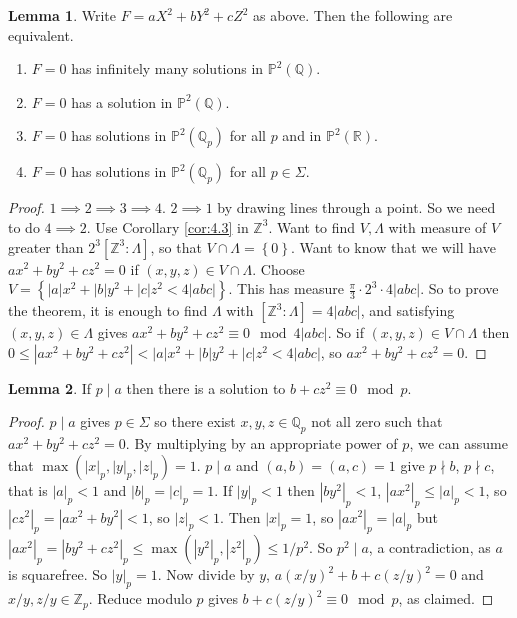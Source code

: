 \documentclass{article}
\newcommand{\Z}{\mathbb{Z}}
\newcommand{\Q}{\mathbb{Q}}
\newcommand{\R}{\mathbb{R}}
\renewcommand{\P}{\mathbb{P}}
\newcommand{\rb}[1]{\left( #1 \right)}
\renewcommand{\sb}[1]{\left[ #1 \right]}
\newcommand{\cb}[1]{\left\{ #1 \right\}}
\newcommand{\abs}[1]{\left\lvert #1 \right\rvert}
\theoremstyle{definition}\newtheorem{definition}{Definition}[section]
\theoremstyle{definition}\newtheorem{remark}[definition]{Remark}
\theoremstyle{definition}\newtheorem*{example}{Example}
\theoremstyle{definition}\newtheorem*{note}{Note}
\newtheorem{lemma}[definition]{Lemma}
\begin{document}
\begin{lemma}
Write $ F = aX^2 + bY^2 + cZ^2 $ as above. Then the following are equivalent.
\begin{enumerate}
\item $ F = 0 $ has infinitely many solutions in $ \P^2\rb{\Q} $.
\item $ F = 0 $ has a solution in $ \P^2\rb{\Q} $.
\item $ F = 0 $ has solutions in $ \P^2\rb{\Q_p} $ for all $ p $ and in $ \P^2\rb{\R} $.
\item $ F = 0 $ has solutions in $ \P^2\rb{\Q_p} $ for all $ p \in \Sigma $.
\end{enumerate}
\end{lemma}

\begin{proof}
$ 1 \implies 2 \implies 3 \implies 4 $. $ 2 \implies 1 $ by drawing lines through a point. So we need to do $ 4 \implies 2 $. Use Corollary \ref{cor:4.3} in $ \Z^3 $. Want to find $ V, \Lambda $ with measure of $ V $ greater than $ 2^3\sb{\Z^3 : \Lambda} $, so that $ V \cap \Lambda = \cb{0} $. Want to know that we will have $ ax^2 + by^2 + cz^2 = 0 $ if $ \rb{x, y, z} \in V \cap \Lambda $. Choose $ V = \cb{\abs{a}x^2 + \abs{b}y^2 + \abs{c}z^2 < 4\abs{abc}} $. This has measure $ \tfrac{\pi}{3} \cdot 2^3 \cdot 4\abs{abc} $. So to prove the theorem, it is enough to find $ \Lambda $ with $ \sb{\Z^3 : \Lambda} = 4\abs{abc} $, and satisfying $ \rb{x, y, z} \in \Lambda $ gives $ ax^2 + by^2 + cz^2 \equiv 0 \mod 4\abs{abc} $. So if $ \rb{x, y, z} \in V \cap \Lambda $ then $ 0 \le \abs{ax^2 + by^2 + cz^2} < \abs{a}x^2 + \abs{b}y^2 + \abs{c}z^2 < 4\abs{abc} $, so $ ax^2 + by^2 + cz^2 = 0 $.
\end{proof}


\begin{lemma}
If $ p \mid a $ then there is a solution to $ b + cz^2 \equiv 0 \mod p $.
\end{lemma}

\begin{proof}
$ p \mid a $ gives $ p \in \Sigma $ so there exist $ x, y, z \in \Q_p $ not all zero such that $ ax^2 + by^2 + cz^2 = 0 $. By multiplying by an appropriate power of $ p $, we can assume that $ \max\rb{\abs{x}_p, \abs{y}_p, \abs{z}_p} = 1 $. $ p \mid a $ and $ \rb{a, b} = \rb{a, c} = 1 $ give $ p \nmid b $, $ p \nmid c $, that is $ \abs{a}_p < 1 $ and $ \abs{b}_p = \abs{c}_p = 1 $. If $ \abs{y}_p < 1 $ then $ \abs{by^2}_p < 1 $, $ \abs{ax^2}_p \le \abs{a}_p < 1 $, so $ \abs{cz^2}_p = \abs{ax^2 + by^2} < 1 $, so $ \abs{z}_p < 1 $. Then $ \abs{x}_p = 1 $, so $ \abs{ax^2}_p = \abs{a}_p $ but $ \abs{ax^2}_p = \abs{by^2 + cz^2}_p \le \max\rb{\abs{y^2}_p, \abs{z^2}_p} \le 1 / p^2 $. So $ p^2 \mid a $, a contradiction, as $ a $ is squarefree. So $ \abs{y}_p = 1 $. Now divide by $ y $, $ a\rb{x / y}^2 + b + c\rb{z / y}^2 = 0 $ and $ x / y, z / y \in \Z_p $. Reduce modulo $ p $ gives $ b + c\rb{z / y}^2 \equiv 0 \mod p $, as claimed.
\end{proof}
\end{document}
